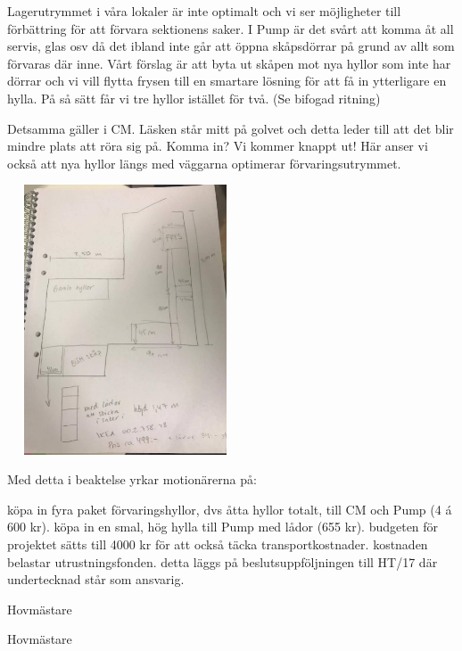 \documentclass[../_main/handlingar.tex]{subfiles}
\begin{document}
Lagerutrymmet i våra lokaler är inte optimalt och vi ser möjligheter till förbättring för att förvara sektionens saker. I Pump är det svårt att komma åt all servis, glas osv då det ibland inte går att öppna skåpsdörrar på grund av allt som förvaras där inne. Vårt förslag är att byta ut skåpen mot nya hyllor som inte har dörrar och vi vill flytta frysen till en smartare lösning för att få in ytterligare en hylla. På så sätt får vi tre hyllor istället för två. (Se bifogad ritning)

Detsamma gäller i CM. Läsken står mitt på golvet och detta leder till att det blir mindre plats att röra sig på. Komma in? Vi kommer knappt ut! Här anser vi också att nya hyllor längs med väggarna optimerar förvaringsutrymmet.

\begin{center}
\includegraphics[width=7cm,height=8cm]{lager.png}
\end{center}

Med detta i beaktelse yrkar motionärerna på:
\begin{attsatser}
    \att köpa in fyra paket förvaringshyllor, dvs åtta hyllor totalt, till CM och Pump (4 á 600 kr).
    \att köpa in en smal, hög hylla till Pump med lådor (655 kr).
    \att budgeten för projektet sätts till 4000 kr för att också täcka transportkostnader.
    \att kostnaden belastar utrustningsfonden.
    \att detta läggs på beslutsuppföljningen till HT/17 där undertecknad står som ansvarig.
\end{attsatser}
\begin{signatures}{2}
    \mvh
    \signature{Sanna Nordberg}{Hovmästare}
    \signature{Matilda Dahlström}{Hovmästare}
\end{signatures}
\end{document}
